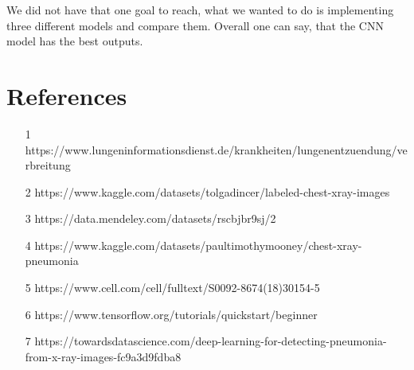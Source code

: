 \documentclass{article}
\begin{document}
We did not have that one goal to reach, what we wanted to do is implementing three different models and compare them. 
Overall one can say, that the CNN model has the best outputs. 

\section{References}
\begin{enumerate}
  \item [1] https://www.lungeninformationsdienst.de/krankheiten/lungenentzuendung/verbreitung
  \item [2] https://www.kaggle.com/datasets/tolgadincer/labeled-chest-xray-images
  \item [3] https://data.mendeley.com/datasets/rscbjbr9sj/2
  \item [4] https://www.kaggle.com/datasets/paultimothymooney/chest-xray-pneumonia
  \item [5] https://www.cell.com/cell/fulltext/S0092-8674(18)30154-5
  \item [6] https://www.tensorflow.org/tutorials/quickstart/beginner
  \item [7] https://towardsdatascience.com/deep-learning-for-detecting-pneumonia-from-x-ray-images-fc9a3d9fdba8
\end{enumerate}
\end{document}
